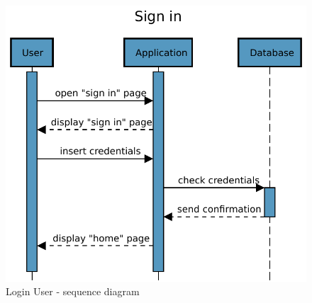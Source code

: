 \begin{figure}[H]
    \centering
    \includegraphics[scale=0.7]{Images/Sequence diagrams/User - sign in.pdf}

    \caption{Login User - sequence diagram}
    \label{fig:fig:seq_diag_sign_in}
\end{figure}

